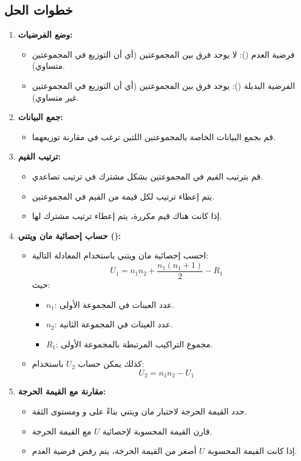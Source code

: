 \subsection*{خطوات الحل}

\begin{enumerate}
	\item \textbf{وضع الفرضيات:}
	\begin{itemize}
		\item فرضية العدم (): لا يوجد فرق بين المجموعتين (أي أن التوزيع في المجموعتين متساوي).
		\item الفرضية البديلة (): يوجد فرق بين المجموعتين (أي أن التوزيع في المجموعتين غير متساوي).
	\end{itemize}
	
	\item \textbf{جمع البيانات:}
	\begin{itemize}
		\item قم بجمع البيانات الخاصة بالمجموعتين اللتين ترغب في مقارنة توزيعهما.
	\end{itemize}
	
	\item \textbf{ترتيب القيم:}
	\begin{itemize}
		\item قم بترتيب القيم في المجموعتين بشكل مشترك في ترتيب تصاعدي.
		\item يتم إعطاء ترتيب لكل قيمة من القيم في المجموعتين.
		\item إذا كانت هناك قيم مكررة، يتم إعطاء ترتيب مشترك لها.
	\end{itemize}
	
	\item \textbf{حساب إحصائية مان ويتني ():}
	\begin{itemize}
		\item احسب إحصائية مان ويتني باستخدام المعادلة التالية:
		\[
		U_1 = n_1 n_2 + \frac{n_1(n_1 + 1)}{2} - R_1
		\]
		حيث:
		\begin{itemize}
			\item \( n_1 \): عدد العينات في المجموعة الأولى.
			\item \( n_2 \): عدد العينات في المجموعة الثانية.
			\item \( R_1 \): مجموع التراكيب المرتبطة بالمجموعة الأولى.
		\end{itemize}
		\item كذلك يمكن حساب \( U_2 \) باستخدام:
		\[
		U_2 = n_1 n_2 - U_1
		\]
	\end{itemize}
	
	\item \textbf{مقارنة مع القيمة الحرجة:}
	\begin{itemize}
		\item حدد القيمة الحرجة لاختبار مان ويتني بناءً على  و  ومستوى الثقة.
		\item قارن القيمة المحسوبة لإحصائية \( U \) مع القيمة الحرجة.
		\item إذا كانت القيمة المحسوبة \( U \) أصغر من القيمة الحرجة، يتم رفض فرضية العدم.
	\end{itemize}
	

\end{enumerate}
